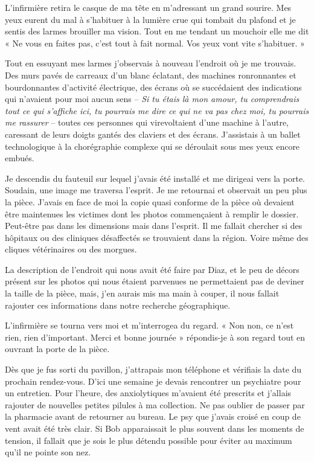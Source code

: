 L'infirmière retira le casque de ma tête en m'adressant un grand sourire. Mes yeux eurent du mal à s'habituer à la
lumière crue qui tombait du plafond et je sentis des larmes brouiller ma vision. Tout en me tendant un mouchoir elle me
dit « Ne vous en faites pas, c'est tout à fait normal. Vos yeux vont vite s'habituer. »

Tout en essuyant mes larmes j'observais à nouveau l'endroit où je me trouvais. Des murs pavés de carreaux d'un blanc
éclatant, des machines ronronnantes et bourdonnantes d'activité électrique, des écrans où se succédaient des indications
qui n'avaient pour moi aucun sens -- \emph{Si tu étais là mon amour, tu comprendrais tout ce qui s'affiche ici, tu
pourrais me dire ce qui ne va pas chez moi, tu pourrais me rassurer} -- toutes ces personnes qui virevoltaient d'une
machine à l'autre, caressant de leurs doigts gantés des claviers et des écrans. J'assistais à un ballet technologique à 
la chorégraphie complexe qui se déroulait sous mes yeux encore embués.

Je descendis du fauteuil sur lequel j'avais été installé et me dirigeai vers la porte. Soudain, une image me traversa
l'esprit. Je me retournai et observait un peu plus la pièce. J'avais en face de moi la copie quasi conforme de la pièce
où devaient être maintenues les victimes dont les photos commençaient à remplir le dossier. Peut-être pas dans les
dimensions mais dans l'esprit. Il me fallait chercher si des hôpitaux ou des cliniques désaffectés se trouvaient dans la
région. Voire même des cliques vétérinaires ou des morgues.

La description de l'endroit qui nous avait été faire par Diaz, et le peu de décors présent sur les photos qui nous
étaient parvenues ne permettaient pas de deviner la taille de la pièce, mais, j'en aurais mis ma main à couper, il nous
fallait rajouter ces informations dans notre recherche géographique.

L'infirmière se tourna vers moi et m'interrogea du regard. « Non non, ce n'est rien, rien d'important. Merci et bonne 
journée » répondis-je à son regard tout en ouvrant la porte de la pièce.

Dès que je fus sorti du pavillon, j'attrapais mon téléphone et vérifiais la date du prochain rendez-vous. D'ici une 
semaine je devais rencontrer un psychiatre pour un entretien. Pour l'heure, des anxiolytiques m'avaient été prescrits et 
j'allais rajouter de nouvelles petites pilules à ma collection. Ne pas oublier de passer par la pharmacie avant de 
retourner au bureau. Le psy que j'avais croisé en coup de vent avait été très clair. Si Bob apparaissait le plus souvent 
dans les moments de tension, il fallait que je sois le plus détendu possible pour éviter au maximum qu'il ne pointe son 
nez.

